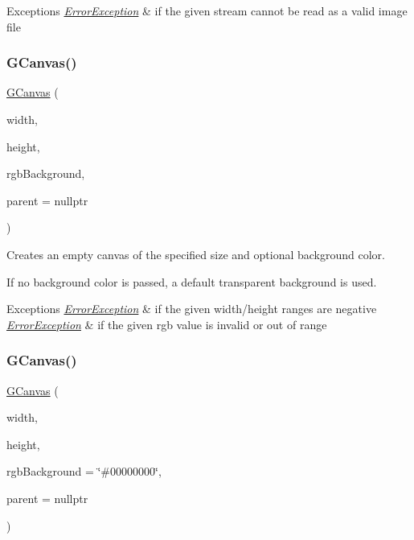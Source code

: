 \begin{DoxyExceptions}{Exceptions}
{\em \mbox{\hyperlink{classErrorException}{Error\+Exception}}} & if the given stream cannot be read as a valid image file \\
\hline
\end{DoxyExceptions}
\mbox{\label{classGCanvas_a235f6b1b700354d6737607562df06581}} 
\subsubsection{\texorpdfstring{G\+Canvas()}{GCanvas()}\hspace{0.1cm}{\footnotesize\ttfamily [4/5]}}
{\footnotesize\ttfamily \mbox{\hyperlink{classGCanvas}{G\+Canvas}} (\begin{DoxyParamCaption}\item[{double}]{width,  }\item[{double}]{height,  }\item[{int}]{rgb\+Background,  }\item[{Q\+Widget $\ast$}]{parent = {\ttfamily nullptr} }\end{DoxyParamCaption})}



Creates an empty canvas of the specified size and optional background color. 

If no background color is passed, a default transparent background is used. 
\begin{DoxyExceptions}{Exceptions}
{\em \mbox{\hyperlink{classErrorException}{Error\+Exception}}} & if the given width/height ranges are negative \\
\hline
{\em \mbox{\hyperlink{classErrorException}{Error\+Exception}}} & if the given rgb value is invalid or out of range \\
\hline
\end{DoxyExceptions}
\mbox{\label{classGCanvas_af8bb8bd29201bbb5d0f90016a1d8df2c}} 
\subsubsection{\texorpdfstring{G\+Canvas()}{GCanvas()}\hspace{0.1cm}{\footnotesize\ttfamily [5/5]}}
{\footnotesize\ttfamily \mbox{\hyperlink{classGCanvas}{G\+Canvas}} (\begin{DoxyParamCaption}\item[{double}]{width,  }\item[{double}]{height,  }\item[{const std\+::string \&}]{rgb\+Background = {\ttfamily \char`\"{}\#00000000\char`\"{}},  }\item[{Q\+Widget $\ast$}]{parent = {\ttfamily nullptr} }\end{DoxyParamCaption})}



